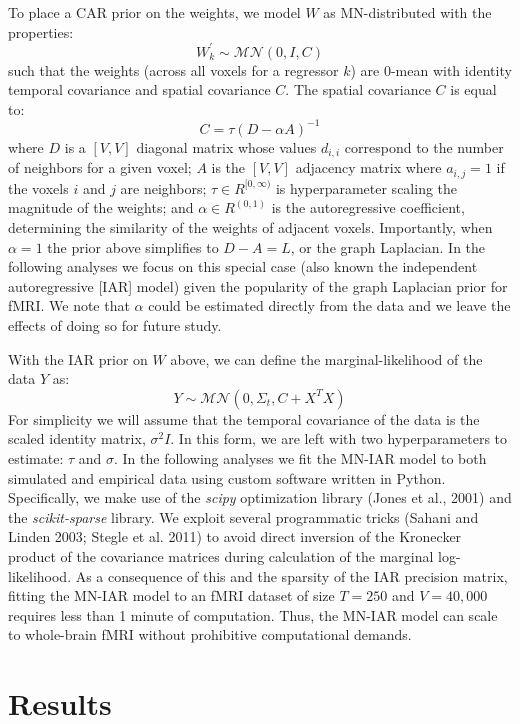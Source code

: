 \documentclass[9pt]{NEU560-final}
\begin{document}
To place a CAR prior on the weights, we model $W$ as MN-distributed with the properties:
$$ W_{k}^{'} \sim \mathcal{MN}(0, I, C) $$
such that the weights (across all voxels for a regressor $k$) are 0-mean with identity temporal covariance and spatial covariance $C$. The spatial covariance $C$ is equal to:
$$ C = \tau (D - \alpha A)^{-1} $$
where $D$ is a $[V,V]$ diagonal matrix whose values $d_{i,i}$ correspond to the number of neighbors for a given voxel; $A$ is the $[V,V]$ adjacency matrix where $a_{i,j} = 1$ if the voxels $i$ and $j$ are neighbors; $\tau \in R^{[0,\infty)}$ is hyperparameter scaling the magnitude of the weights; and $\alpha \in R^{(0,1)}$ is the autoregressive coefficient, determining the similarity of the weights of adjacent voxels. Importantly, when $\alpha = 1$ the prior above simplifies to $D - A = L$, or the graph Laplacian. In the following analyses we focus on this special case (also known the independent autoregressive [IAR] model) given the popularity of the graph Laplacian prior for fMRI. We note that $\alpha$ could be estimated directly from the data and we leave the effects of doing so for future study.

With the IAR prior on $W$ above, we can define the marginal-likelihood of the data $Y$ as:
$$ Y \sim \mathcal{MN}(0, \Sigma_t, C + X^T X) $$
For simplicity we will assume that the temporal covariance of the data is the scaled identity matrix, $\sigma^2 I$. In this form, we are left with two hyperparameters to estimate: $\tau$ and $\sigma$. In the following analyses we fit the MN-IAR model to both simulated and empirical data using custom software written in Python. Specifically, we make use of the \textit{scipy} optimization library (Jones et al., 2001) and the \textit{scikit-sparse} library. We exploit several programmatic tricks (Sahani and Linden 2003; Stegle et al. 2011) to avoid direct inversion of the Kronecker product of the covariance matrices during calculation of the marginal log-likelihood. As a consequence of this and the sparsity of the IAR precision matrix, fitting the MN-IAR model to an fMRI dataset of size $T=250$ and $V = 40,000$ requires less than 1 minute of computation. Thus, the MN-IAR model can scale to whole-brain fMRI without prohibitive computational demands.

\section{Results}
\end{document}
